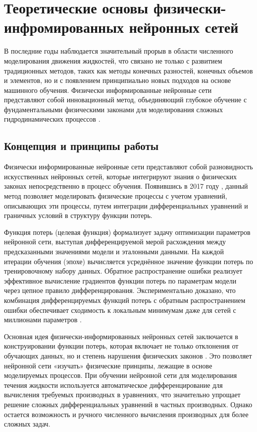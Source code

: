 \chapter{Теоретические основы физически-инфромированных нейронных сетей}

В последние годы наблюдается значительный прорыв в области численного моделирования движения жидкостей,
что связано не только с развитием традиционных методов, таких как методы конечных разностей, конечных
объемов и элементов, но и с появлением принципиально новых подходов на основе машинного обучения.
Физически информированные нейронные сети представляют собой
инновационный метод, объединяющий глубокое обучение с фундаментальными физическими законами для
моделирования сложных гидродинамических процессов \cite{raissi2019physics}.

\section{Концепция и принципы работы}
Физически информированные нейронные сети представляют собой разновидность искусственных нейронных сетей,
которые интегрируют знания о физических законах непосредственно в процесс обучения. Появившись в 2017
году \cite{raissi2017physics}, данный метод позволяет моделировать физические процессы с учетом уравнений,
описывающих эти процессы, путем интеграции дифференциальных уравнений и граничных условий в структуру
функции потерь.

Функция потерь (целевая функция) формализует задачу оптимизации параметров нейронной сети, выступая
дифференцируемой мерой расхождения между предсказанными значениями модели и эталонными данными.
На каждой итерации обучения (эпохе) вычисляется усреднённое значение функции потерь по тренировочному
набору данных. Обратное распространение ошибки реализует эффективное вычисление
градиентов функции потерь по параметрам модели через цепное правило дифференцирования. 
Экспериментально доказано, что комбинация дифференцируемых функций потерь
с обратным распространением ошибки обеспечивает сходимость к локальным минимумам даже для сетей с миллионами
параметров \cite{Goodfellow-et-al-2016}.

Основная идея физически-информированных нейронных сетей заключается в конструировании функции потерь,
которая включает не только отклонения
от обучающих данных, но и степень нарушения физических законов \cite{karniadakis2021physics}. Это
позволяет нейронной сети «изучать» физические принципы, лежащие в основе моделируемых процессов. При
обучении нейронной сети для моделирования течения жидкости используется автоматическое дифференцирование для
вычисления требуемых производных в уравнениях, что значительно упрощает решение сложных дифференциальных
уравнений в частных производных. Однако остается возможность и ручного численного вычисления производных
для более сложных задач.


